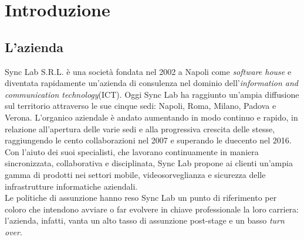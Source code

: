 
\chapter{Introduzione}
\label{cap:introduzione}





\section{L'azienda}

Sync Lab S.R.L. è una società fondata nel 2002 a Napoli come \textit{software house} e diventata rapidamente un'azienda di consulenza nel dominio dell'\emph{\gls{information and communication technology}}\glsfirstoccur (ICT).
Oggi Sync Lab ha raggiunto un’ampia diffusione sul territorio attraverso le sue cinque sedi: Napoli, Roma, Milano, Padova e Verona.
L’organico aziendale è andato aumentando in modo continuo e rapido, in relazione all’apertura delle varie sedi e alla progressiva crescita delle stesse, raggiungendo le cento collaborazioni nel 2007 e superando le duecento nel 2016. Con l’aiuto dei suoi specialisti, che lavorano continuamente in maniera sincronizzata, collaborativa e disciplinata, Sync Lab propone ai clienti un'ampia gamma di prodotti nei settori mobile, videosorveglianza e sicurezza delle infrastrutture informatiche aziendali.\\
Le politiche di assunzione hanno reso Sync Lab un punto di riferimento per coloro che intendono avviare o far evolvere in chiave professionale la loro carriera: l'azienda, infatti, vanta un alto tasso di assunzione post-stage e un basso \emph{\gls{turn over}}\glsfirstoccur.\\\\

